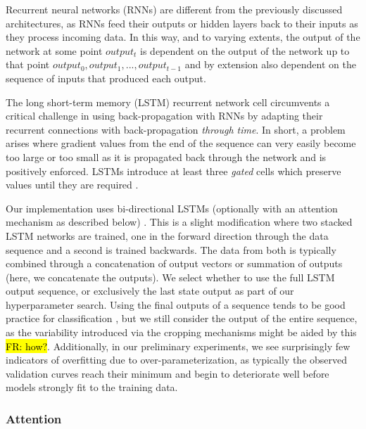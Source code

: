 \documentclass[utf8]{frontiersSCNS} %
\newcommand{\FR}[1]{{\small \textcolor{red}{\hl{FR: #1}}}}
\begin{document}
Recurrent neural networks (RNNs) are different from the previously discussed architectures, as RNNs feed their outputs or hidden layers back to their inputs as they process incoming data. In this way, and to varying extents, the output of the network at some point $output_t$ is dependent on the output of the network up to that point $output_0, output_1, ..., output_{t-1}$ and by extension also dependent on the sequence of inputs that produced each output. 

The long short-term memory (LSTM) \cite{Hochreiter1997a} recurrent network cell circumvents a critical challenge in using back-propagation with RNNs by adapting their recurrent connections with back-propagation {\em through time}. In short, a problem arises where gradient values from the end of the sequence can very easily become too large or too small as it is propagated back through the network and is positively enforced. LSTMs introduce at least three \emph{gated} cells which preserve values until they are required  \cite{GravesRNNBook}.

Our implementation uses bi-directional LSTMs (optionally with an attention mechanism as described below) \cite{GravesRNNBook}. This is a slight modification where two stacked LSTM networks are trained, one in the forward direction through the data sequence and a second is trained backwards. The data from both is typically combined through a concatenation of output vectors or summation of outputs (here, we concatenate the outputs). We select whether to use the full LSTM output sequence, or exclusively the last state output as part of our hyperparameter search. Using the final outputs of a sequence tends to be good practice for classification \cite{}, but we still consider the output of the entire sequence, as the variability introduced via the cropping mechanisms might be aided by this \FR{how?}. Additionally, in our preliminary experiments, we see surprisingly few indicators of overfitting due to over-parameterization, as typically the observed validation curves reach their minimum and begin to deteriorate well before models strongly fit to the training data. 

\subsubsection{Attention}

\end{document}
